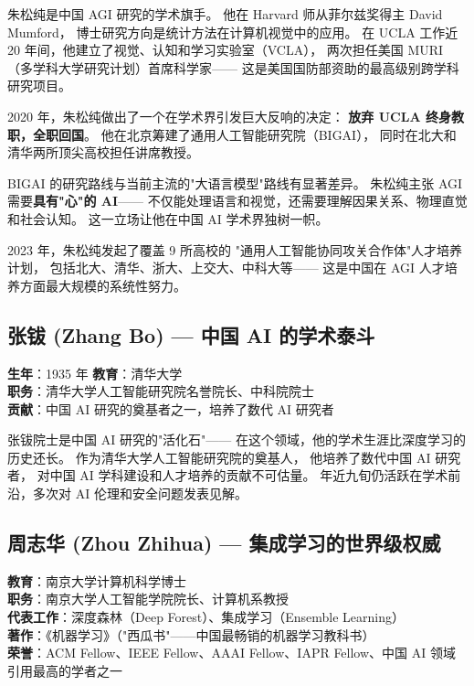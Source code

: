 朱松纯是中国 AGI 研究的学术旗手。
他在 Harvard 师从菲尔兹奖得主 David Mumford，
博士研究方向是统计方法在计算机视觉中的应用。
在 UCLA 工作近 20 年间，他建立了视觉、认知和学习实验室（VCLA），
两次担任美国 MURI（多学科大学研究计划）首席科学家——
这是美国国防部资助的最高级别跨学科研究项目。

2020 年，朱松纯做出了一个在学术界引发巨大反响的决定：
\textbf{放弃 UCLA 终身教职，全职回国}。
他在北京筹建了通用人工智能研究院（BIGAI），
同时在北大和清华两所顶尖高校担任讲席教授。

BIGAI 的研究路线与当前主流的"大语言模型"路线有显著差异。
朱松纯主张 AGI 需要\textbf{具有"心"的 AI}——
不仅能处理语言和视觉，还需要理解因果关系、物理直觉和社会认知。
这一立场让他在中国 AI 学术界独树一帜。

2023 年，朱松纯发起了覆盖 9 所高校的
"通用人工智能协同攻关合作体"人才培养计划，
包括北大、清华、浙大、上交大、中科大等——
这是中国在 AGI 人才培养方面最大规模的系统性努力。


\subsection{张钹 (Zhang Bo) — 中国 AI 的学术泰斗}

\begin{keybox}[人物档案：张钹]
\textbf{生年}：1935 年 \quad \textbf{教育}：清华大学 \\
\textbf{职务}：清华大学人工智能研究院名誉院长、中科院院士 \\
\textbf{贡献}：中国 AI 研究的奠基者之一，培养了数代 AI 研究者
\end{keybox}

张钹院士是中国 AI 研究的"活化石"——
在这个领域，他的学术生涯比深度学习的历史还长。
作为清华大学人工智能研究院的奠基人，
他培养了数代中国 AI 研究者，
对中国 AI 学科建设和人才培养的贡献不可估量。
年近九旬仍活跃在学术前沿，多次对 AI 伦理和安全问题发表见解。


\subsection{周志华 (Zhou Zhihua) — 集成学习的世界级权威}

\begin{keybox}
\textbf{教育}：南京大学计算机科学博士 \\
\textbf{职务}：南京大学人工智能学院院长、计算机系教授 \\
\textbf{代表工作}：深度森林（Deep Forest）、集成学习（Ensemble Learning）\\
\textbf{著作}：《机器学习》（"西瓜书"——中国最畅销的机器学习教科书）\\
\textbf{荣誉}：ACM Fellow、IEEE Fellow、AAAI Fellow、IAPR Fellow、中国 AI 领域引用最高的学者之一
\end{keybox}

